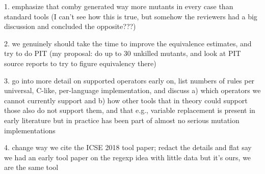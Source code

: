 1. emphasize that comby generated way more mutants in every case than standard tools (I can't see how this is true, but somehow the reviewers had a big discussion and concluded the opposite???)

2.  we genuinely should take the time to improve the equivalence estimates, and try to do PIT (my proposal:  do up to 30 unkilled mutants, and look at PIT source reports to try to figure equivalency there)

3.  go into more detail on supported operators early on, list numbers of rules per universal, C-like, per-language implementation, and discuss a) which operators we cannot currently support and b) how other tools that in theory could support those also do not support them, and that e.g., variable replacement is present in early literature but in practice has been part of almost no serious mutation implementations

4. change way we cite the ICSE 2018 tool paper; redact the details and flat say we had an early tool paper on the regexp idea with little data but it's ours, we are the same tool